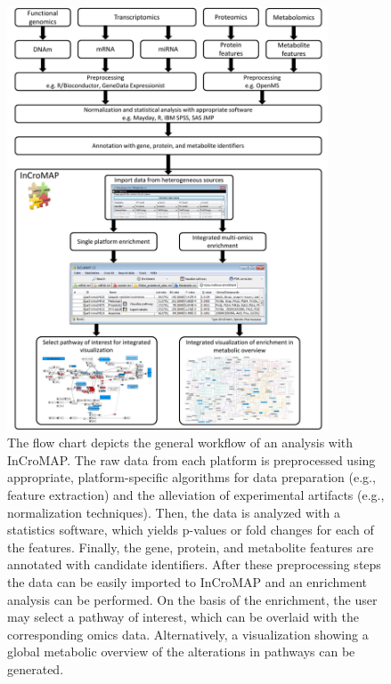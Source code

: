 \documentclass[final,5p,times,twocolumn]{elsarticle}
\begin{document}
\begin{figure}
\center
\includegraphics[width=0.85\textwidth]{InCroMAP_workflow.pdf}
\caption{The flow chart depicts the general workflow of an analysis with InCroMAP. The raw data from each platform is preprocessed using appropriate, platform-specific algorithms for data preparation (e.g., feature extraction) and the alleviation of experimental artifacts (e.g., normalization techniques). Then, the data is analyzed with a statistics software, which yields p-values or fold changes for each of the features. Finally, the gene, protein, and metabolite features are annotated with candidate identifiers. After these preprocessing steps the data can be easily imported to InCroMAP and an enrichment analysis can be performed. On the basis of the enrichment, the user may select a pathway of interest, which can be overlaid with the corresponding omics data. Alternatively, a visualization showing a global metabolic overview of the alterations in pathways can be generated.}
\label{fig:incromap-workflow}
\end{figure}
\end{document}
